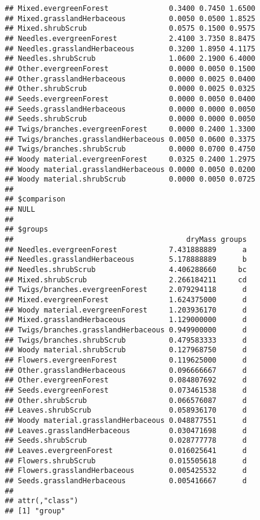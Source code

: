 \documentclass[
]{article}
\begin{document}
\begin{verbatim}
## Mixed.evergreenForest              0.3400 0.7450 1.6500
## Mixed.grasslandHerbaceous          0.0050 0.0500 1.8525
## Mixed.shrubScrub                   0.0575 0.1500 0.9575
## Needles.evergreenForest            2.4100 3.7350 8.8475
## Needles.grasslandHerbaceous        0.3200 1.8950 4.1175
## Needles.shrubScrub                 1.0600 2.1900 6.4000
## Other.evergreenForest              0.0000 0.0050 0.1500
## Other.grasslandHerbaceous          0.0000 0.0025 0.0400
## Other.shrubScrub                   0.0000 0.0025 0.0325
## Seeds.evergreenForest              0.0000 0.0050 0.0400
## Seeds.grasslandHerbaceous          0.0000 0.0000 0.0050
## Seeds.shrubScrub                   0.0000 0.0000 0.0050
## Twigs/branches.evergreenForest     0.0000 0.2400 1.3300
## Twigs/branches.grasslandHerbaceous 0.0050 0.0600 0.3375
## Twigs/branches.shrubScrub          0.0000 0.0700 0.4750
## Woody material.evergreenForest     0.0325 0.2400 1.2975
## Woody material.grasslandHerbaceous 0.0000 0.0050 0.0200
## Woody material.shrubScrub          0.0000 0.0050 0.0725
## 
## $comparison
## NULL
## 
## $groups
##                                        dryMass groups
## Needles.evergreenForest            7.431888889      a
## Needles.grasslandHerbaceous        5.178888889      b
## Needles.shrubScrub                 4.406288660     bc
## Mixed.shrubScrub                   2.266184211     cd
## Twigs/branches.evergreenForest     2.079294118      d
## Mixed.evergreenForest              1.624375000      d
## Woody material.evergreenForest     1.203936170      d
## Mixed.grasslandHerbaceous          1.129000000      d
## Twigs/branches.grasslandHerbaceous 0.949900000      d
## Twigs/branches.shrubScrub          0.479583333      d
## Woody material.shrubScrub          0.127968750      d
## Flowers.evergreenForest            0.119625000      d
## Other.grasslandHerbaceous          0.096666667      d
## Other.evergreenForest              0.084807692      d
## Seeds.evergreenForest              0.073461538      d
## Other.shrubScrub                   0.066576087      d
## Leaves.shrubScrub                  0.058936170      d
## Woody material.grasslandHerbaceous 0.048877551      d
## Leaves.grasslandHerbaceous         0.030471698      d
## Seeds.shrubScrub                   0.028777778      d
## Leaves.evergreenForest             0.016025641      d
## Flowers.shrubScrub                 0.015505618      d
## Flowers.grasslandHerbaceous        0.005425532      d
## Seeds.grasslandHerbaceous          0.005416667      d
## 
## attr(,"class")
## [1] "group"
\end{verbatim}
\end{document}
